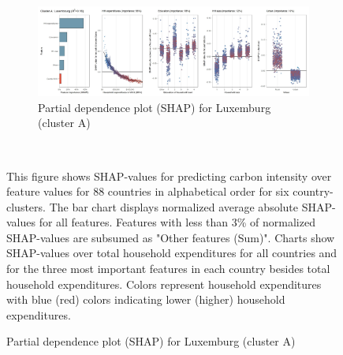 \begin{figure}[ht!]
    \\
    \vspace{0.5cm}
   \begin{subfigure}[b]{\textwidth}
   \centering
         \caption{Partial dependence plot (SHAP) for Luxemburg (cluster A)}
         \label{fig:5b_LUX}
         \includegraphics[width=\textwidth]{Figure 5b/Figure_5b_LUX}
         \end{subfigure}
    \\
    \vspace{0.5cm}
   
    \begin{subcaption2}
     This figure shows SHAP-values for predicting carbon intensity over feature values for 88 countries in alphabetical order for six country-clusters. The bar chart displays normalized average absolute SHAP-values for all features. Features with less than 3\% of normalized SHAP-values are subsumed as "Other features (Sum)". Charts show SHAP-values over total household expenditures for all countries and for the three most important features in each country besides total household expenditures. Colors represent household expenditures with blue (red) colors indicating lower (higher) household expenditures.
     \end{subcaption2}
\end{figure}

